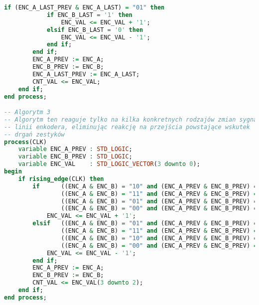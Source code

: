 \documentclass[12pt]{article}
\begin{document}
\begin{lstlisting}[language=VHDL, style=mystyle]
        if (ENC_A_LAST_PREV & ENC_A_LAST) = "01" then
            if ENC_B_LAST = '1' then
                ENC_VAL <= ENC_VAL + '1';
            elsif ENC_B_LAST = '0' then
                ENC_VAL <= ENC_VAL - '1';
            end if;
        end if;
        ENC_A_PREV := ENC_A;
        ENC_B_PREV := ENC_B;
        ENC_A_LAST_PREV := ENC_A_LAST;
        CNT_VAL <= ENC_VAL;
    end if;
end process;

-- Algorytm 3
-- Algorytm ten reaguje tylko na kilka konkretnych rodzajów zmian sygnałów
-- linii enkodera, eliminując reakcję na przejścia powstające wskutek
-- drgań zestyków
process(CLK)
    variable ENC_A_PREV : STD_LOGIC;
    variable ENC_B_PREV : STD_LOGIC;
    variable ENC_VAL    : STD_LOGIC_VECTOR(3 downto 0);
begin
    if rising_edge(CLK) then
        if      ((ENC_A & ENC_B) = "10" and (ENC_A_PREV & ENC_B_PREV) = "00") or
                ((ENC_A & ENC_B) = "11" and (ENC_A_PREV & ENC_B_PREV) = "10") or
                ((ENC_A & ENC_B) = "01" and (ENC_A_PREV & ENC_B_PREV) = "11") or
                ((ENC_A & ENC_B) = "00" and (ENC_A_PREV & ENC_B_PREV) = "01") then
            ENC_VAL <= ENC_VAL + '1';
        elsif   ((ENC_A & ENC_B) = "01" and (ENC_A_PREV & ENC_B_PREV) = "00") or
                ((ENC_A & ENC_B) = "11" and (ENC_A_PREV & ENC_B_PREV) = "01") or
                ((ENC_A & ENC_B) = "10" and (ENC_A_PREV & ENC_B_PREV) = "11") or
                ((ENC_A & ENC_B) = "00" and (ENC_A_PREV & ENC_B_PREV) = "10") then
            ENC_VAL <= ENC_VAL - '1';
        end if;
        ENC_A_PREV := ENC_A;
        ENC_B_PREV := ENC_B;
        CNT_VAL <= ENC_VAL(3 downto 2);
    end if;
end process;
\end{lstlisting}
\end{document}
